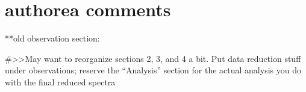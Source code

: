 \section{authorea comments}

**old observation section:

#>>May want to reorganize sections 2, 3, and 4 a bit. Put data reduction stuff under observations; reserve the “Analysis” section for the actual analysis you do with the final reduced spectra












